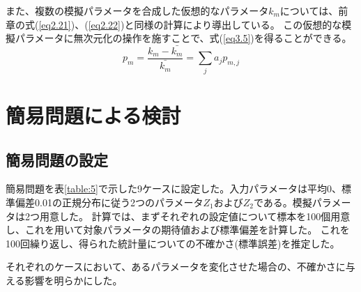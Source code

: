 \documentclass[a4paper,11pt,titlepage,uplatex]{jsreport}
\begin{document}
また、複数の模擬パラメータを合成した仮想的なパラメータ$k_m$については、前章の式(\ref{eq2.21})、(\ref{eq2.22})と同様の計算により導出している。
この仮想的な模擬パラメータに無次元化の操作を施すことで、式(\ref{eq3.5})を得ることができる。
\begin{equation}
  p_m = \frac{k_{m}-\bar{k_{m}}}{\bar{k_{m}}} = \sum_{j}a_{j}p_{m,j}
  \label{eq3.5}
\end{equation}
\newpage

\chapter{簡易問題による検討}

\section{簡易問題の設定}
簡易問題を表\ref{table:5}で示した9ケースに設定した。入力パラメータは平均0、標準偏差0.01の正規分布に従う2つのパラメータ$Z_1$および$Z_2$である。模擬パラメータは2つ用意した。
計算では、まずそれぞれの設定値について標本を100個用意し、これを用いて対象パラメータの期待値および標準偏差を計算した。
これを100回繰り返し、得られた統計量についての不確かさ(標準誤差)を推定した。

それぞれのケースにおいて、あるパラメータを変化させた場合の、不確かさに与える影響を明らかにした。
\end{document}

